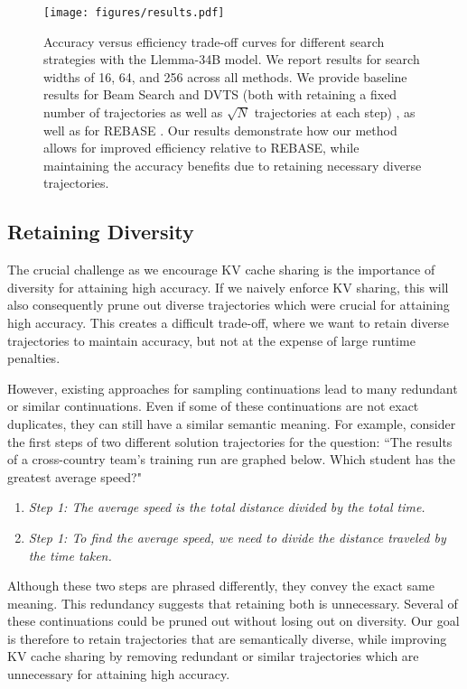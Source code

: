 \begin{figure*}[h]%
\centering
\texttt{[image: figures/results.pdf]}
\vspace*{-2mm}
 \caption{ 
 Accuracy versus efficiency trade-off curves for different search strategies with the Llemma-34B model.
 We report results for search widths of 16, 64, and 256 across all methods.
 We provide baseline results for Beam Search and DVTS (both with retaining a fixed number of trajectories as well as $\sqrt{N}$ trajectories at each step) \cite{snell2024scaling,beeching2024scalingtesttimecompute}, as well as for REBASE \cite{wu2024inference}.
 Our results demonstrate how our method allows for improved efficiency relative to REBASE, while maintaining the accuracy benefits due to retaining necessary diverse trajectories.
  }
  \vspace{-2mm}
  \label{fig:results}
\end{figure*}
 
\subsection{Retaining Diversity}

The crucial challenge as we encourage KV cache sharing is the importance of diversity for attaining high accuracy.
If we naively enforce KV sharing, this will also consequently prune out diverse trajectories which were crucial for attaining high accuracy.
This creates a difficult trade-off, where we want to retain diverse trajectories to maintain accuracy, but not at the expense of large runtime penalties.

However, existing approaches for sampling continuations lead to many redundant or similar continuations.
Even if some of these continuations are not exact duplicates, they can still have a similar semantic meaning.
For example, consider the first steps of two different solution trajectories for the question: ``The results of a cross-country team's training run are graphed below. Which student has the greatest average speed?"
\begin{enumerate}
    \item \textit{Step 1: The average speed is the total distance divided by the total time.}
    \item \textit{Step 1: To find the average speed, we need to divide the distance traveled by the time taken.}
\end{enumerate}
Although these two steps are phrased differently, they convey the exact same meaning. This redundancy suggests that retaining both is unnecessary.
Several of these continuations could be pruned out without losing out on diversity.
Our goal is therefore to retain trajectories that are semantically diverse,
while improving KV cache sharing by removing redundant or similar trajectories which are unnecessary for attaining high accuracy. 

